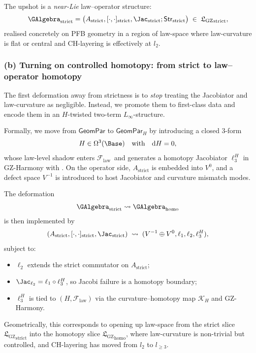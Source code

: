 \documentclass[11pt]{book}
\theoremstyle{plain}
\theoremstyle{definition}
\newcommand{\GZLS}{\ensuremath{\mathfrak{L}_{\mathrm{GZ}}}}       \newcommand{\GZLT}{\ensuremath{M_{!w}}}                           \newcommand{\GZLOC}{\ensuremath{A_M}}                             \newcommand{\GZLCurv}{\ensuremath{\mathcal{F}_{\mathrm{law}}}}
\begin{document}
The upshot is a \emph{near-Lie} law--operator structure:
\[
   \GAlgebra_{\mathrm{strict}}
   =
   \bigl(
     A_{\mathrm{strict}},
     [\cdot,\cdot]_{\mathrm{strict}},
     \Jac_{\mathrm{strict}};\mathsf{Str}_{\mathrm{strict}}
   \bigr)
   \;\in\;
   {\GZLS}_{\mathrm{strict}},
\]
realised concretely on PFB geometry in a region of law-space where
law-curvature is flat or central and CH-layering is effectively at
$l_2$.



\subsubsection*{(b) Turning on controlled homotopy: from strict to law--operator homotopy}

The first deformation away from strictness is to \emph{stop} treating
the Jacobiator and law-curvature as negligible. Instead, we promote
them to first-class data and encode them in an $H$-twisted two-term
$L_\infty$-structure.

Formally, we move from $\mathsf{GeomPar}$ to
$\mathsf{GeomPar}_H$ by introducing a closed 3-form
\[
  H\in\Omega^3(\Base)
  \quad\text{with}\quad
  \mathrm{d}H=0,
\]
whose law-level shadow enters \GZLCurv\ and generates a homotopy
Jacobiator $\ell_3^H$ in GZ-Harmony with \GZTLC. On the operator side,
$A_{\mathrm{strict}}$ is embedded into $V^0$, and a defect space
$V^{-1}$ is introduced to host Jacobiator and curvature mismatch
modes.

The deformation
\[
   \GAlgebra_{\mathrm{strict}}
   \leadsto
   \GAlgebra_{\mathrm{homo}}
\]
is then implemented by
\[
  (A_{\mathrm{strict}},[\cdot,\cdot]_{\mathrm{strict}},
   \Jac_{\mathrm{strict}})
  \;\rightsquigarrow\;
  (V^{-1}\oplus V^0,\ell_1,\ell_2,\ell_3^H),
\]
subject to:

\begin{itemize}
  \item $\ell_2$ extends the strict commutator on $A_{\mathrm{strict}}$;
  \item $\Jac_{\ell_2}=\ell_1\circ\ell_3^H$, so Jacobi failure is a
        homotopy boundary;
  \item $\ell_3^H$ is tied to $(H,\GZLCurv)$ via the curvature–homotopy
        map $\mathcal{K}_H$ and GZ-Harmony.
\end{itemize}

Geometrically, this corresponds to opening up law-space from the
strict slice ${\GZLS}_{\mathrm{strict}}$ into the homotopy slice
${\GZLS}_{\mathrm{homo}}$, where law-curvature is non-trivial but
controlled, and CH-layering has moved from $l_2$ to $l_{\ge3}$.
\end{document}
